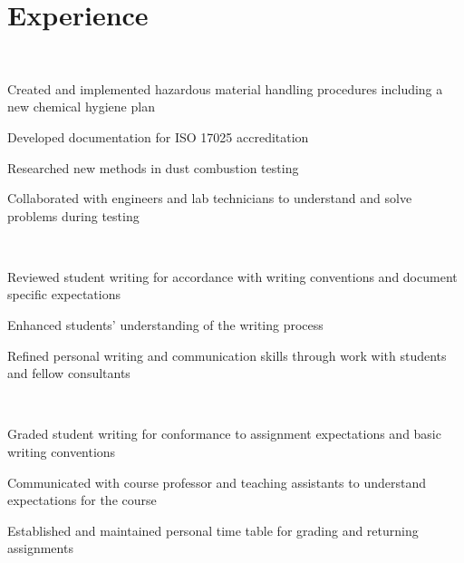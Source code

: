 \documentclass[]{deedy-resume-openfont}
\begin{document}
\hfill
\begin{minipage}[t]{0.66\textwidth} 


\section{Experience}
\sectionsep
{} \\
\vspace{\topsep} %
\begin{tightemize}
	\item Created and implemented hazardous material handling procedures including a new chemical hygiene plan
	\item Developed documentation for ISO 17025 accreditation
	\item Researched new methods in dust combustion testing
	\item Collaborated with engineers and lab technicians to understand and solve problems during testing
\end{tightemize}
\sectionsep

 \\
\begin{tightemize}
	\item Reviewed student writing for accordance with writing conventions and document specific expectations
	\item Enhanced students' understanding of the writing process
	\item Refined personal writing and communication skills through work with students and fellow consultants
\end{tightemize}
\sectionsep

 \\
\begin{tightemize}
	\item Graded student writing for conformance to assignment expectations and basic writing conventions
	\item Communicated with course professor and teaching assistants to understand expectations for the course
	\item Established and maintained personal time table for grading and returning assignments
\end{tightemize}
\sectionsep


\end{minipage}
\end{document}
